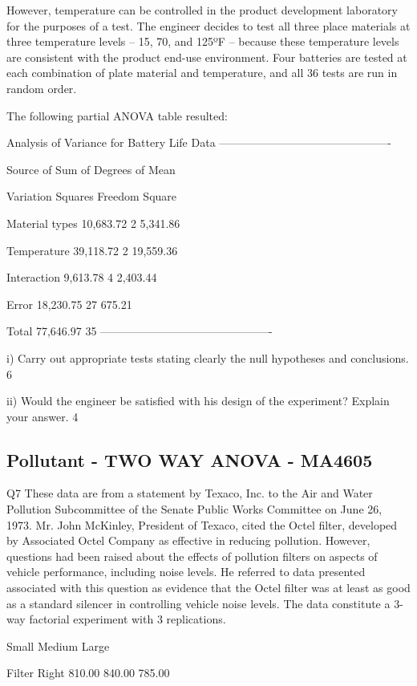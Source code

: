 However, temperature can be controlled in the product development laboratory for the purposes of a test. 
The engineer decides to test all three place materials at three temperature levels – 15, 70, and 125ºF – because these temperature levels are consistent with the product 
end-use environment. Four batteries are tested at each combination of plate material and temperature, and all 36 tests are run in random order.


The following partial ANOVA table resulted:

Analysis of Variance for Battery Life Data
----------------------------------------------

Source of Sum of Degrees of Mean

Variation Squares Freedom Square

Material types 10,683.72 2 5,341.86

Temperature 39,118.72 2 19,559.36

Interaction 9,613.78 4 2,403.44

Error 18,230.75 27 675.21

Total 77,646.97 35
----------------------------------------------

i) Carry out appropriate tests stating clearly the null hypotheses and conclusions. 6

ii) Would the engineer be satisfied with his design of the experiment? Explain your answer. 4


\subsection{Pollutant - TWO WAY ANOVA - MA4605}
Q7 These data are from a statement by Texaco, Inc. to the Air and Water Pollution Subcommittee of the Senate Public Works Committee on June 26, 1973. Mr. John McKinley, President of Texaco, cited the Octel filter, developed by Associated Octel Company as effective in reducing pollution. However, questions had been raised about the effects of pollution filters on aspects of vehicle performance, including noise levels. He referred to data presented associated with this question as evidence that the Octel filter was at least as good as a standard silencer in controlling vehicle noise levels. The data constitute a 3-way factorial experiment with 3 replications.

Small Medium Large

Filter Right 810.00 840.00 785.00

